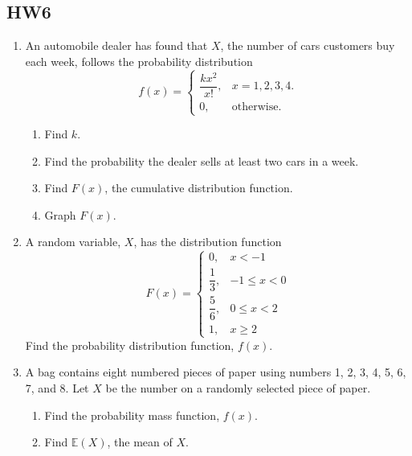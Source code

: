 \documentclass[12pt]{article}
\begin{document}
\subsection*{HW6}

\begin{enumerate}
  \item An automobile dealer has found that $X$, the number of cars customers buy each week, follows the probability distribution
    \[
      f(x) = \begin{cases} \dfrac{kx^2}{x!}, & x = 1, 2, 3, 4. \\[6pt] 0, & \text{otherwise.} \end{cases}
    \]
    \begin{enumerate}[label=(\alph*)]
      \item Find $k$.
      \item Find the probability the dealer sells at least two cars in a week.
      \item Find $F(x)$, the cumulative distribution function.
      \item Graph $F(x)$.
    \end{enumerate}

\newpage

  \item A random variable, $X$, has the distribution function
    \[
      F(x) = \begin{cases} 0, & x < -1 \\[4pt] \dfrac{1}{3}, & -1 \le x < 0 \\[6pt] \dfrac{5}{6}, & 0 \le x < 2 \\[6pt] 1, & x \ge 2 \end{cases}
    \]
    Find the probability distribution function, $f(x)$.

\newpage

  \item A bag contains eight numbered pieces of paper using numbers 1, 2, 3, 4, 5, 6, 7, and 8. Let $X$ be the number on a randomly selected piece of paper.
    \begin{enumerate}[label=(\alph*)]
      \item Find the probability mass function, $f(x)$.
      \item Find $\mathbb{E}(X)$, the mean of $X$.
    \end{enumerate}

\newpage


\end{enumerate}
\end{document}
